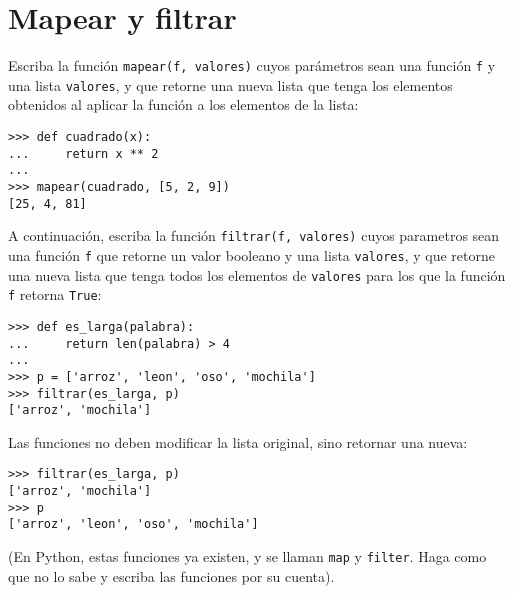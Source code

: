 \section{Mapear y filtrar}

Escriba la función \lstinline!mapear(f, valores)! cuyos parámetros sean
una función \lstinline!f! y una lista \lstinline!valores!, y que retorne
una nueva lista que tenga los elementos obtenidos al aplicar la función
a los elementos de la lista:

\begin{lstlisting}
>>> def cuadrado(x):
...     return x ** 2
...
>>> mapear(cuadrado, [5, 2, 9])
[25, 4, 81]
\end{lstlisting}

A continuación,
escriba la función \lstinline!filtrar(f, valores)! cuyos parametros sean
una función \lstinline!f! que retorne un valor booleano y una lista
\lstinline!valores!, y que retorne una nueva lista que tenga todos los
elementos de \lstinline!valores! para los que la función \lstinline!f!
retorna \lstinline!True!:

\begin{lstlisting}
>>> def es_larga(palabra):
...     return len(palabra) > 4
...
>>> p = ['arroz', 'leon', 'oso', 'mochila']
>>> filtrar(es_larga, p)
['arroz', 'mochila']
\end{lstlisting}

Las funciones no deben modificar la lista original, sino retornar una
nueva:
\begin{lstlisting}
>>> filtrar(es_larga, p)
['arroz', 'mochila']
>>> p
['arroz', 'leon', 'oso', 'mochila']
\end{lstlisting}

(En Python, estas funciones ya existen, y se llaman \lstinline!map! y
\lstinline!filter!. Haga como que no lo sabe y escriba las funciones por
su cuenta).
